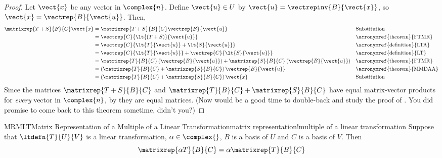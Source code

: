 %
\begin{proof}
Let $\vect{x}$ be any vector in $\complex{n}$.  Define $\vect{u}\in U$ by $\vect{u}=\vectrepinv{B}{\vect{x}}$, so $\vect{x}=\vectrep{B}{\vect{u}}$.  Then,
%
\begin{align*}
\matrixrep{T+S}{B}{C}\vect{x}&=
\matrixrep{T+S}{B}{C}\vectrep{B}{\vect{u}}&&\text{Substitution}\\
&=\vectrep{C}{\lt{\left(T+S\right)}{\vect{u}}}&&\text{\acronymref{theorem}{FTMR}}\\
&=\vectrep{C}{\lt{T}{\vect{u}}+\lt{S}{\vect{u}}}&&\text{\acronymref{definition}{LTA}}\\
&=\vectrep{C}{\lt{T}{\vect{u}}}+\vectrep{C}{\lt{S}{\vect{u}}}&&\text{\acronymref{definition}{LT}}\\
&=\matrixrep{T}{B}{C}\left(\vectrep{B}{\vect{u}}\right)+\matrixrep{S}{B}{C}\left(\vectrep{B}{\vect{u}}\right)&&\text{\acronymref{theorem}{FTMR}}\\
&=\left(\matrixrep{T}{B}{C}+\matrixrep{S}{B}{C}\right)\vectrep{B}{\vect{u}}&&\text{\acronymref{theorem}{MMDAA}}\\
&=\left(\matrixrep{T}{B}{C}+\matrixrep{S}{B}{C}\right)\vect{x}&&\text{Substitution}
\end{align*}
%
Since the matrices $\matrixrep{T+S}{B}{C}$ and $\matrixrep{T}{B}{C}+\matrixrep{S}{B}{C}$ have equal matrix-vector products for {\em every} vector in $\complex{n}$, by  they are equal matrices.  (Now would be a good time to double-back and study the proof of .  You did promise to come back to this theorem sometime, didn't you?)
%
\end{proof}
%
%
\begin{theorem}{MRMLT}{Matrix Representation of a Multiple of a Linear Transformation}{matrix representation!multiple of a linear transformation}
Suppose that $\ltdefn{T}{U}{V}$ is a linear transformation, $\alpha\in\complex{\null}$, $B$ is a basis of $U$ and $C$ is a basis of $V$.  Then
%
\begin{equation*}
\matrixrep{\alpha T}{B}{C}=\alpha\matrixrep{T}{B}{C}
\end{equation*}
%
\end{theorem}
%
